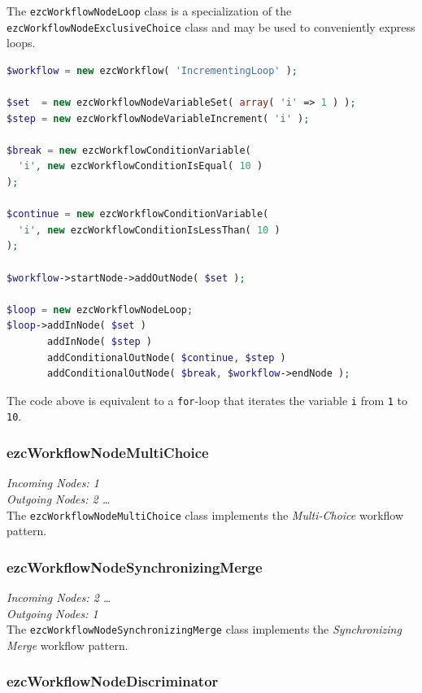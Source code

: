 The \texttt{ezcWorkflowNodeLoop} class is a specialization of the
\texttt{ezcWorkflowNodeExclusiveChoice} class and may be used to conveniently
express loops.

\begin{lstlisting}[language=PHP]
$workflow = new ezcWorkflow( 'IncrementingLoop' );

$set  = new ezcWorkflowNodeVariableSet( array( 'i' => 1 ) );
$step = new ezcWorkflowNodeVariableIncrement( 'i' );

$break = new ezcWorkflowConditionVariable(
  'i', new ezcWorkflowConditionIsEqual( 10 )
);

$continue = new ezcWorkflowConditionVariable(
  'i', new ezcWorkflowConditionIsLessThan( 10 )
);

$workflow->startNode->addOutNode( $set );

$loop = new ezcWorkflowNodeLoop;
$loop->addInNode( $set )
       addInNode( $step )
       addConditionalOutNode( $continue, $step )
       addConditionalOutNode( $break, $workflow->endNode );
\end{lstlisting}

The code above is equivalent to a \texttt{for}-loop that iterates the variable
\texttt{i} from \texttt{1} to \texttt{10}.

\subsubsection{ezcWorkflowNodeMultiChoice}

\emph{Incoming Nodes: 1}\\
\emph{Outgoing Nodes: 2 \dots *}\\

The \texttt{ezcWorkflowNodeMultiChoice} class implements the \emph{Multi-Choice}
workflow pattern.

\subsubsection{ezcWorkflowNodeSynchronizingMerge}

\emph{Incoming Nodes: 2 \dots *}\\
\emph{Outgoing Nodes: 1}\\

The \texttt{ezcWorkflowNodeSynchronizingMerge} class implements the
\emph{Synchronizing Merge} workflow pattern.

\subsubsection{ezcWorkflowNodeDiscriminator}

